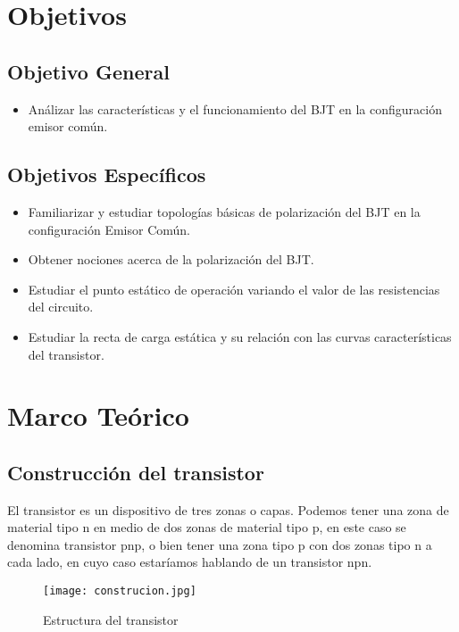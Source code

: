 \documentclass[10pt, a4paper]{article}
\begin{document}
    \newpage

    \section{Objetivos}

    \subsection{Objetivo General}
    \begin{itemize}
        \item Análizar las características y el funcionamiento del BJT en la configuración emisor común. 
    \end{itemize}

    \subsection{Objetivos Específicos}
    \begin{itemize}
        \item Familiarizar y estudiar topologías básicas de polarización del BJT en la configuración Emisor Común.
        \item Obtener nociones acerca de la polarización del BJT.
        \item Estudiar el punto estático de operación variando el valor de las resistencias del circuito.
        \item Estudiar la recta de carga estática y su relación con las curvas características del transistor.
    \end{itemize}

    \newpage

    \section{Marco Teórico}

    \subsection{Construcción del transistor}

    El transistor es un dispositivo de tres zonas o capas. Podemos tener una zona de material tipo n en medio de dos zonas de material tipo p, en este caso se denomina transistor pnp, o bien tener una zona tipo p con dos zonas tipo n a cada lado, en cuyo caso estaríamos hablando de un transistor npn.

    \begin{figure}[h!]
        \centering
        \texttt{[image: construcion.jpg]}
        \caption{\label{fig:1} Estructura del transistor }
    \end{figure}
\end{document}
